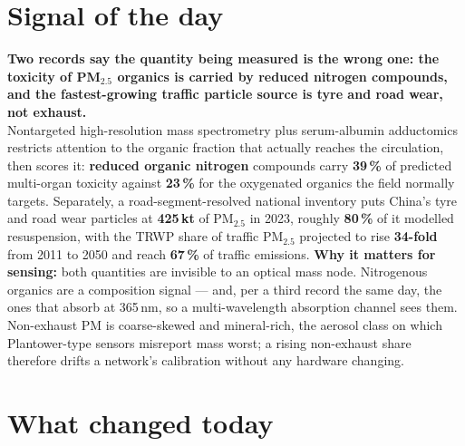 \documentclass[10pt]{article}
\begin{document}
\vspace{6mm}

\section*{\sffamily\bfseries\color{Deep}Signal of the day}
\vspace{-1.5mm}{\color{Amber}\rule{\linewidth}{1.1pt}}\vspace{2.5mm}

\begin{keybox}
{\sffamily\bfseries\small\color{Deep}Two records say the quantity being measured is the wrong
one: the toxicity of PM$_{2.5}$ organics is carried by reduced nitrogen compounds, and the fastest-growing
traffic particle source is tyre and road wear, not exhaust.}\\[1.4mm]
\footnotesize
Nontargeted high-resolution mass spectrometry plus serum-albumin adductomics restricts attention to the
organic fraction that actually reaches the circulation, then scores it: \textbf{reduced organic nitrogen}
compounds carry \textbf{39\,\%} of predicted multi-organ toxicity against \textbf{23\,\%} for the
oxygenated organics the field normally targets. Separately, a road-segment-resolved national inventory
puts China's tyre and road wear particles at \textbf{425\,kt} of PM$_{2.5}$ in 2023, roughly
\textbf{80\,\%} of it modelled resuspension, with the TRWP share of traffic PM$_{2.5}$ projected to rise
\textbf{34-fold} from 2011 to 2050 and reach \textbf{67\,\%} of traffic emissions.
\textbf{Why it matters for sensing:} both quantities are invisible to an optical mass node. Nitrogenous
organics are a composition signal --- and, per a third record the same day, the ones that absorb at
365\,nm, so a multi-wavelength absorption channel sees them. Non-exhaust PM is coarse-skewed and
mineral-rich, the aerosol class on which Plantower-type sensors misreport mass worst; a rising non-exhaust
share therefore drifts a network's calibration without any hardware changing.\par
\end{keybox}

\vspace{3mm}

\section*{\sffamily\bfseries\color{Deep}What changed today}
\vspace{-1.5mm}{\color{Amber}\rule{\linewidth}{1.1pt}}\vspace{2.5mm}
\end{document}
